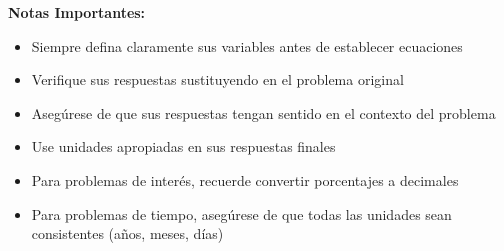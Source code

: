 \begin{center}
\end{center}

\textbf{Notas Importantes:}
\begin{itemize}
    \item Siempre defina claramente sus variables antes de establecer ecuaciones
    \item Verifique sus respuestas sustituyendo en el problema original
    \item Asegúrese de que sus respuestas tengan sentido en el contexto del problema
    \item Use unidades apropiadas en sus respuestas finales
    \item Para problemas de interés, recuerde convertir porcentajes a decimales
    \item Para problemas de tiempo, asegúrese de que todas las unidades sean consistentes (años, meses, días)
\end{itemize}
